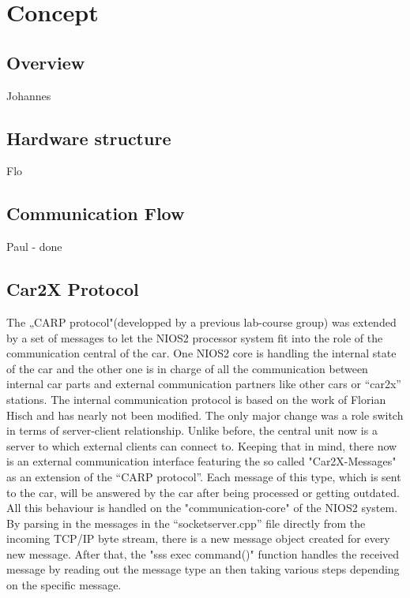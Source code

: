 \chapter{Concept}

\section{Overview}
Johannes

\section{Hardware structure}
Flo

\section{Communication Flow}
Paul - done

\section{Car2X Protocol}
The „CARP protocol"(developped by a previous lab-course group) was extended by a set of messages to let the NIOS2 processor system fit into the role of the communication central of the car. One NIOS2 core is handling the internal state of the car and the other one is in charge of all the communication between internal car parts and external communication partners like other cars or “car2x” stations. \newline
The internal communication protocol is based on the work of Florian Hisch and has nearly not been modified. The only major change was a role switch in terms of server-client relationship. Unlike before, the central unit now is a server to which external clients can connect to.
Keeping that in mind, there now is an external communication interface featuring the so called "Car2X-Messages" as an extension of the “CARP protocol”. Each message of this type, which is sent to the car, will be answered by the car after being processed or getting outdated. 
\newline
All this behaviour is handled on the "communication-core" of the NIOS2 system.
By parsing in the messages in the “socketserver.cpp” file directly from the incoming TCP/IP byte stream, there is a new message object created for every new message.
After that, the "sss exec command()" function handles the received message by reading out the message type an then taking various steps depending on the specific message.

